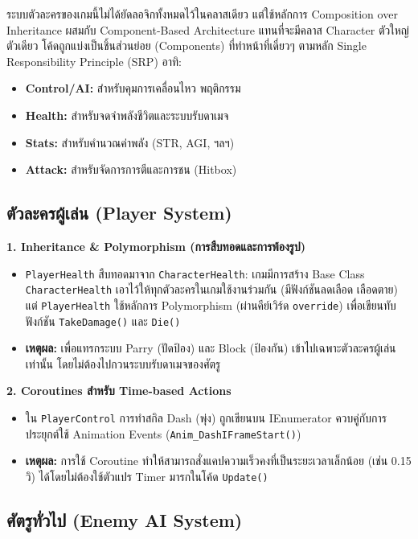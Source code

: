 ระบบตัวละครของเกมนี้ไม่ได้ยัดลอจิกทั้งหมดไว้ในคลาสเดียว แต่ใช้หลักการ Composition over Inheritance ผสมกับ Component-Based Architecture แทนที่จะมีคลาส Character ตัวใหญ่ตัวเดียว โค้ดถูกแบ่งเป็นชิ้นส่วนย่อย (Components) ที่ทำหน้าที่เดี่ยวๆ ตามหลัก Single Responsibility Principle (SRP) อาทิ:

\begin{itemize}
\item \textbf{Control/AI:} สำหรับคุมการเคลื่อนไหว พฤติกรรม
\item \textbf{Health:} สำหรับจดจำพลังชีวิตและระบบรับดาเมจ
\item \textbf{Stats:} สำหรับคำนวณค่าพลัง (STR, AGI, ฯลฯ)
\item \textbf{Attack:} สำหรับจัดการการตีและการชน (Hitbox)
\end{itemize}

\subsection{ตัวละครผู้เล่น (Player System)}

\textbf{1. Inheritance \& Polymorphism (การสืบทอดและการพ้องรูป)}

\begin{itemize}
\item \texttt{PlayerHealth} สืบทอดมาจาก \texttt{CharacterHealth}: เกมมีการสร้าง Base Class \texttt{CharacterHealth} เอาไว้ให้ทุกตัวละครในเกมใช้งานร่วมกัน (มีฟังก์ชันลดเลือด เลือดตาย) แต่ \texttt{PlayerHealth} ใช้หลักการ Polymorphism (ผ่านคีย์เวิร์ด \texttt{override}) เพื่อเขียนทับฟังก์ชัน \texttt{TakeDamage()} และ \texttt{Die()}
\item \textbf{เหตุผล:} เพื่อแทรกระบบ Parry (ปัดป้อง) และ Block (ป้องกัน) เข้าไปเฉพาะตัวละครผู้เล่นเท่านั้น โดยไม่ต้องไปกวนระบบรับดาเมจของศัตรู
\end{itemize}

\textbf{2. Coroutines สำหรับ Time-based Actions}

\begin{itemize}
\item ใน \texttt{PlayerControl} การทำสกิล Dash (พุ่ง) ถูกเขียนบน IEnumerator ควบคู่กับการประยุกต์ใช้ Animation Events (\texttt{Anim\_DashIFrameStart()})
\item \textbf{เหตุผล:} การใช้ Coroutine ทำให้สามารถสั่งแคปความเร็วคงที่เป็นระยะเวลาเล็กน้อย (เช่น 0.15 วิ) ได้โดยไม่ต้องใช้ตัวแปร Timer มารกในโค้ด \texttt{Update()}
\end{itemize}

\subsection{ศัตรูทั่วไป (Enemy AI System)}

